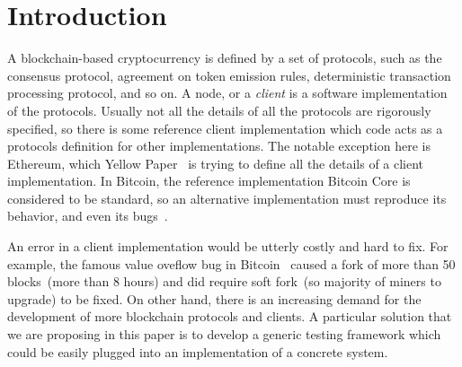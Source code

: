 
\section{Introduction}

A blockchain-based cryptocurrency is defined by a set of protocols, such as the consensus protocol, agreement on token emission rules, deterministic transaction processing protocol, and so on. A node, or a {\em client} is a software implementation of the protocols. Usually not all the details of all the protocols are rigorously specified, so there is some reference client implementation which code acts as a protocols definition for other implementations. The notable exception here is Ethereum, which Yellow Paper~\cite{ethyp} is trying to define all the details of a client implementation. In Bitcoin, the reference implementation Bitcoin Core is considered to be standard, so an alternative implementation must reproduce its behavior, and even its bugs~\cite{bitbugs}.

An error in a client implementation would be utterly costly and hard to fix. For example, the famous value oveflow bug in Bitcoin~\cite{overflow} caused a fork of more than 50 blocks~(more than 8 hours) and did require soft fork~(so majority of miners to upgrade) to be fixed. On other hand, there is an increasing demand for the development of more blockchain protocols and clients. A particular solution that we are proposing in this paper is to develop a generic testing framework which could be easily plugged into an implementation of a concrete system.
